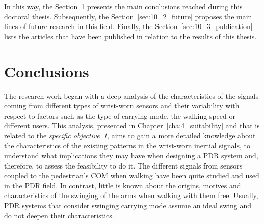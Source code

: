 In this way, the Section~\ref{sec:10_1_specObj} presents the main conclusions reached during this doctoral thesis.
Subsequently, the Section~\ref{sec:10_2_future} proposes the main lines of future research in this field.
Finally, the Section~\ref{sec:10_3_publication} lists the articles that have been published in relation to the results of this thesis. 

\section{Conclusions}
\label{sec:10_1_specObj}
The research work began with a deep analysis of the characteristics of the signals coming from different types of wrist-worn sensors and their variability with respect to factors such as the type of carrying mode, the walking speed or different users.
This analysis, presented in Chapter~\ref{cha:4_suitability} and that is related to the \emph{specific objective~1}, aims to gain a more detailed knowledge about the characteristics of the existing patterns in the wrist-worn inertial signals, to understand what implications they may have when designing a PDR system and, therefore, to assess the feasibility to do it.
The different signals from sensors coupled to the pedestrian's COM when walking have been quite studied and used in the PDR field.
In contrast, little is known about the origins, motives and characteristics of the swinging of the arms when walking with them free.
Usually, PDR systems that consider swinging carrying mode assume an ideal swing and do not deepen their characteristics.
